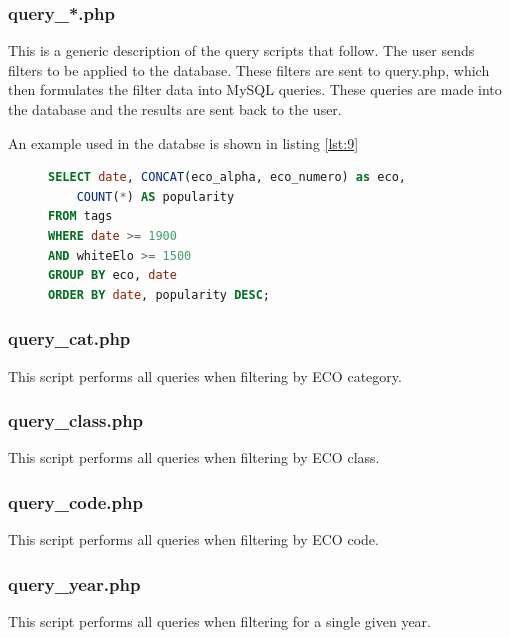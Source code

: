 \documentclass{article}
\begin{document}
\subsubsection{query\_*.php}
This is a generic description of the query scripts that follow. The user
sends filters to be applied to the database.  These filters are sent to
query.php, which then formulates the filter data into MySQL queries.
These queries are made into the database and the results are sent back to
the user.

An example used in the databse is shown in listing \ref{lst:9}
\begin{figure}[h]
	\begin{lstlisting}[label={lst:9}, language=sql, frame=single,
	caption=Queries for ECO categories]
SELECT date, CONCAT(eco_alpha, eco_numero) as eco, 
	COUNT(*) AS popularity
FROM tags
WHERE date >= 1900 
AND whiteElo >= 1500 
GROUP BY eco, date
ORDER BY date, popularity DESC;
	\end{lstlisting}
\end{figure}

\subsubsection{query\_cat.php}
This script performs all queries when filtering by ECO category.

\subsubsection{query\_class.php}
This script performs all queries when filtering by ECO class.

\subsubsection{query\_code.php}
This script performs all queries when filtering by ECO code.

\subsubsection{query\_year.php}
This script performs all queries when filtering for a single given year.
\end{document}
